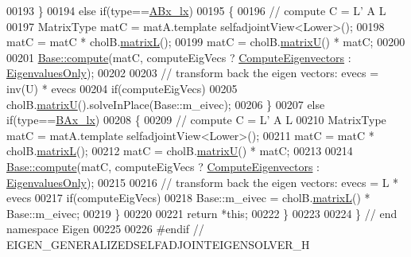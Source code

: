 \begin{DoxyCode}
00193   \}
00194   \textcolor{keywordflow}{else} \textcolor{keywordflow}{if}(type==\hyperlink{group__enums_ggae3e239fb70022eb8747994cf5d68b4a9afc36646eaa4187858eaad466d32a2096}{ABx\_lx})
00195   \{
00196     \textcolor{comment}{// compute C = L' A L}
00197     MatrixType matC = matA.template selfadjointView<Lower>();
00198     matC = matC * cholB.\hyperlink{group___cholesky___module_a7f4a3eedbf82e7ce2d6bf0dcd84cdfa3}{matrixL}();
00199     matC = cholB.\hyperlink{group___cholesky___module_a18a390f085567e650e8345cc7e7c0df8}{matrixU}() * matC;
00200 
00201     \hyperlink{group___eigenvalues___module_a88bcdc24112efa7c4d2ebb3476efcbe9}{Base::compute}(matC, computeEigVecs ? \hyperlink{group__enums_ggae3e239fb70022eb8747994cf5d68b4a9ada93d8885bde32b876ba4af01d3292cc}{ComputeEigenvectors} : 
      \hyperlink{group__enums_ggae3e239fb70022eb8747994cf5d68b4a9ad0c82cf0a9daf2a63bb6e2f10d51f69c}{EigenvaluesOnly});
00202 
00203     \textcolor{comment}{// transform back the eigen vectors: evecs = inv(U) * evecs}
00204     \textcolor{keywordflow}{if}(computeEigVecs)
00205       cholB.\hyperlink{group___cholesky___module_a18a390f085567e650e8345cc7e7c0df8}{matrixU}().solveInPlace(Base::m\_eivec);
00206   \}
00207   \textcolor{keywordflow}{else} \textcolor{keywordflow}{if}(type==\hyperlink{group__enums_ggae3e239fb70022eb8747994cf5d68b4a9a5b64c528c90483f0b716018cad0143f8}{BAx\_lx})
00208   \{
00209     \textcolor{comment}{// compute C = L' A L}
00210     MatrixType matC = matA.template selfadjointView<Lower>();
00211     matC = matC * cholB.\hyperlink{group___cholesky___module_a7f4a3eedbf82e7ce2d6bf0dcd84cdfa3}{matrixL}();
00212     matC = cholB.\hyperlink{group___cholesky___module_a18a390f085567e650e8345cc7e7c0df8}{matrixU}() * matC;
00213 
00214     \hyperlink{group___eigenvalues___module_a88bcdc24112efa7c4d2ebb3476efcbe9}{Base::compute}(matC, computeEigVecs ? \hyperlink{group__enums_ggae3e239fb70022eb8747994cf5d68b4a9ada93d8885bde32b876ba4af01d3292cc}{ComputeEigenvectors} : 
      \hyperlink{group__enums_ggae3e239fb70022eb8747994cf5d68b4a9ad0c82cf0a9daf2a63bb6e2f10d51f69c}{EigenvaluesOnly});
00215 
00216     \textcolor{comment}{// transform back the eigen vectors: evecs = L * evecs}
00217     \textcolor{keywordflow}{if}(computeEigVecs)
00218       Base::m\_eivec = cholB.\hyperlink{group___cholesky___module_a7f4a3eedbf82e7ce2d6bf0dcd84cdfa3}{matrixL}() * Base::m\_eivec;
00219   \}
00220 
00221   \textcolor{keywordflow}{return} *\textcolor{keyword}{this};
00222 \}
00223 
00224 \} \textcolor{comment}{// end namespace Eigen}
00225 
00226 \textcolor{preprocessor}{#endif // EIGEN\_GENERALIZEDSELFADJOINTEIGENSOLVER\_H}
\end{DoxyCode}
